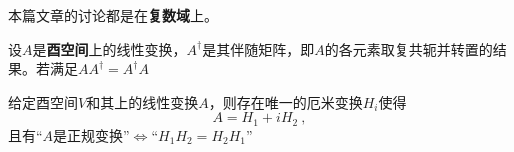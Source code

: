 本篇文章的讨论都是在\textbf{复数域}上。
\begin{definition}{}
设$A$是\textbf{酉空间}上的线性变换，$A^{\dagger}$是其伴随矩阵，即$A$的各元素取复共轭并转置的结果。若满足$AA^{\dagger}=A^{\dagger}A$
\end{definition}

\begin{theorem}{}
给定酉空间$V$和其上的线性变换$A$，则存在唯一的厄米变换$H_i$使得
\begin{equation}
A=H_1+iH_2~,
\end{equation}
且有“$A$是正规变换”$\Longleftrightarrow $“$H_1H_2=H_2H_1$”
\end{theorem}

